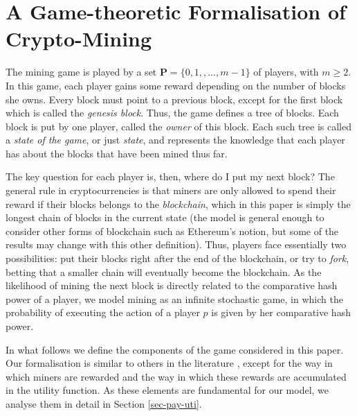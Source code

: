 \documentclass[a4paper,english,cleveref, autoref,numberwithinsect]{lipics-v2019}
\newcommand{\bP}{\mathbf{P}}
\begin{document}

\section{A Game-theoretic Formalisation of Crypto-Mining}
\label{sec-formalization}

The mining game is played by a set $\bP = \{0, 1, , \ldots, m-1\}$ of players, with $m \geq 2$.
In this game, each player gains some reward depending on the number of blocks she owns. Every block must point to a previous block, except for the first block which is called the {\em genesis block}. Thus, the game defines a tree of blocks. Each block is put by one player, called the {\em owner} of this block. Each such tree is called a {\em state of the game}, or just {\em state}, and represents the knowledge that each player has about the blocks that have been mined thus far.

The key question for each player is, then, where do I put my next block? The general rule in cryptocurrencies is that miners are only allowed to spend their reward if their blocks belongs to the \emph{blockchain}, which in this paper is simply the longest chain of blocks in the current state (the model is general enough to consider other forms of blockchain such as 
Ethereum's notion, but some of the results may change with this other definition). Thus, players face essentially two possibilities: put their blocks right after the end of the blockchain, or try to \emph{fork}, betting that a smaller chain will eventually become the blockchain. As the likelihood of mining the next block is directly related to the comparative hash power of a player, we model mining as an infinite stochastic game, in which the probability of executing the action of a player $p$ is given by her comparative hash power.

In what follows we define the components of the game considered in this paper. Our formalisation is similar to others in the literature \cite{mininggames:2016,koutsoupias2018blockchain}, except for the way in which miners are rewarded and the way in which these rewards are accumulated in the utility function. As these elements are fundamental for our model, we analyse them in detail in Section \ref{sec-pay-uti}.
\end{document}
